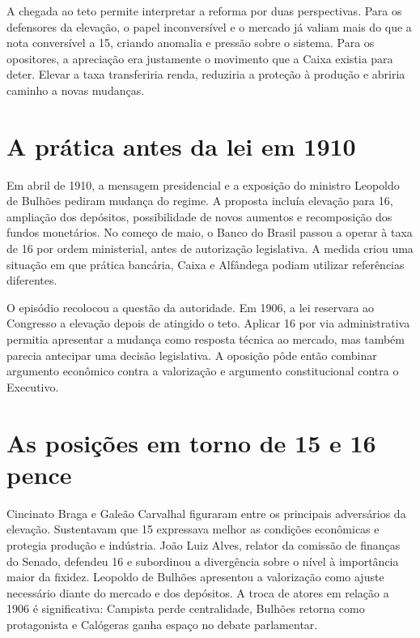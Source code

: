 A chegada ao teto permite interpretar a reforma por duas perspectivas. Para os defensores da elevação, o papel inconversível e o mercado já valiam mais do que a nota conversível a 15, criando anomalia e pressão sobre o sistema. Para os opositores, a apreciação era justamente o movimento que a Caixa existia para deter. Elevar a taxa transferiria renda, reduziria a proteção à produção e abriria caminho a novas mudanças.

\section{A prática antes da lei em 1910}

Em abril de 1910, a mensagem presidencial e a exposição do ministro Leopoldo de Bulhões pediram mudança do regime. A proposta incluía elevação para 16, ampliação dos depósitos, possibilidade de novos aumentos e recomposição dos fundos monetários. No começo de maio, o Banco do Brasil passou a operar à taxa de 16 por ordem ministerial, antes de autorização legislativa. A medida criou uma situação em que prática bancária, Caixa e Alfândega podiam utilizar referências diferentes.


O episódio recolocou a questão da autoridade. Em 1906, a lei reservara ao Congresso a elevação depois de atingido o teto. Aplicar 16 por via administrativa permitia apresentar a mudança como resposta técnica ao mercado, mas também parecia antecipar uma decisão legislativa. A oposição pôde então combinar argumento econômico contra a valorização e argumento constitucional contra o Executivo.

\section{As posições em torno de 15 e 16 pence}

Cincinato Braga e Galeão Carvalhal figuraram entre os principais adversários da elevação. Sustentavam que 15 expressava melhor as condições econômicas e protegia produção e indústria. João Luiz Alves, relator da comissão de finanças do Senado, defendeu 16 e subordinou a divergência sobre o nível à importância maior da fixidez. Leopoldo de Bulhões apresentou a valorização como ajuste necessário diante do mercado e dos depósitos. A troca de atores em relação a 1906 é significativa: Campista perde centralidade, Bulhões retorna como protagonista e Calógeras ganha espaço no debate parlamentar.

